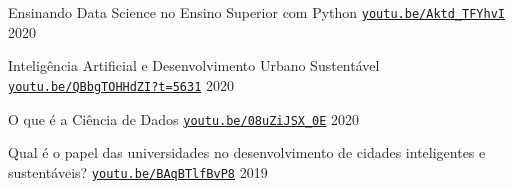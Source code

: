\begin{cventries}
  \cventry
    {} %
    {Ensinando Data Science no Ensino Superior com Python} %
    {\href{https://youtu.be/Aktd_TFYhvI}{\texttt{youtu.be/Aktd_TFYhvI}}} %
    {2020} %
    {}

  \cventry
    {} %
    {Inteligência Artificial e Desenvolvimento Urbano Sustentável} %
    {\href{https://youtu.be/QBbgTOHHdZI?t=5631}{\texttt{youtu.be/QBbgTOHHdZI?t=5631}}} %
    {2020} %
    {}

  \cventry
    {} %
    {O que é a Ciência de Dados} %
    {\href{https://youtu.be/08uZiJSX_0E}{\texttt{youtu.be/08uZiJSX_0E}}} %
    {2020} %
    {}

  \cventry
    {} %
    {Qual é o papel das universidades no desenvolvimento de cidades inteligentes e sustentáveis?} %
    {\href{https://youtu.be/BAqBTlfBvP8}{\texttt{youtu.be/BAqBTlfBvP8}}} %
    {2019} %
    {}


\end{cventries}
